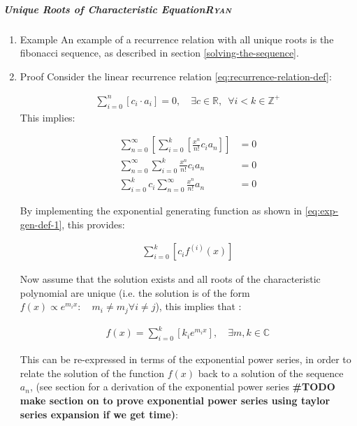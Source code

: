 \documentclass[a4paper,11pt,twoside]{article}
\begin{document}
\subparagraph{Unique Roots of Characteristic Equation\hfill{}\textsc{Ryan}}
\label{uniq-roots-recurrence}
\begin{enumerate}
\item Example
\label{sec:orga55b012}
An example of a recurrence relation with all unique roots is the fibonacci sequence, as described in section \ref{solving-the-sequence}.
\item Proof
\label{sec:org1277411}
Consider the linear recurrence relation \eqref{eq:recurrence-relation-def}:

\begin{align}
\sum^{n}_{i= 0}   \left[ c_i \cdot  a_i \right] = 0, \quad \exists c \in
\mathbb{R}, \enspace \forall i<k\in\mathbb{Z}^+ \nonumber \label{eq:recurrence-relation-def}
\end{align}
This implies:


\begin{align}
    \sum^{\infty}_{n= 0}   \left[ \sum^{k}_{i= 0}   \left[ \frac{x^n}{n!} c_i a_n \right]  \right]  &= 0 \\
    \sum^{\infty}_{n= 0}    \sum^{k}_{i= 0}    \frac{x^n}{n!} c_i a_n    &= 0 \\
        \sum^{k}_{i= 0} c_i \sum^{\infty}_{n= 0}    \frac{x^n}{n!}  a_n    &= 0
\end{align}

By implementing the exponential generating function as shown in
\eqref{eq:exp-gen-def-1}, this provides:

\begin{align}
   \sum^{k}_{i= 0}   \left[ c_i f^{\left( i \right)}\left( x \right) \right]
\end{align}


Now assume that the solution exists and all roots of the characteristic polynomial are unique (i.e. the solution is of the form \(f{\left({ x }\right)} \propto e^{m_i x}: \quad m_i \neq m_j \forall i\neq j\)), this implies that  \cite[Ch. 4]{zillDifferentialEquations2009a} :

\begin{align}
    f{\left({ x }\right)} = \sum^{k}_{i= 0}   {\left[{ k_i e^{m_i x} }\right]}, \quad \exists m,k \in \mathbb{C} \nonumber
\end{align}

This can be re-expressed in terms of the exponential power series, in order to relate the solution of the function \(f{\left({ x }\right)}\) back to a solution of the sequence \(a_n\), (see section for a derivation of the exponential power series \textbf{\#TODO make section on to prove exponential power series using taylor series expansion if we get time)}:


\end{enumerate}
\end{document}
